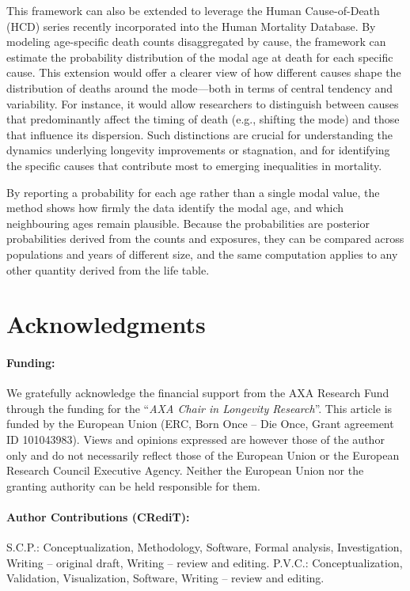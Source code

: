 \documentclass[12pt, letterpaper]{article}
\begin{document}
This framework can also be extended to leverage the Human Cause-of-Death (HCD) series recently incorporated into the Human Mortality Database. By modeling age-specific death counts disaggregated by cause, the framework can estimate the probability distribution of the modal age at death for each specific cause. This extension would offer a clearer view of how different causes shape the distribution of deaths around the mode—both in terms of central tendency and variability. For instance, it would allow researchers to distinguish between causes that predominantly affect the timing of death (e.g., shifting the mode) and those that influence its dispersion. Such distinctions are crucial for understanding the dynamics underlying longevity improvements or stagnation, and for identifying the specific causes that contribute most to emerging inequalities in mortality.

By reporting a probability for each age rather than a single modal value, the method shows how firmly the data identify the modal age, and which neighbouring ages remain plausible. Because the probabilities are posterior probabilities derived from the counts and exposures, they can be compared across populations and years of different size, and the same computation applies to any other quantity derived from the life table.

\section*{Acknowledgments}

\paragraph*{Funding:}
We gratefully acknowledge the financial support from the AXA Research Fund through the funding for the “\textit{AXA Chair in Longevity Research}”. This article is funded by the European Union (ERC, Born Once – Die Once, Grant agreement ID 101043983). Views and opinions expressed are however those of the author only and do not necessarily reflect those of the European Union or the European Research Council Executive Agency. Neither the European Union nor the granting authority can be held responsible for them.

\paragraph*{Author Contributions (CRediT):}
S.C.P.: Conceptualization, Methodology, Software, Formal analysis, Investigation, Writing -- original draft, Writing -- review and editing. P.V.C.: Conceptualization, Validation, Visualization, Software, Writing -- review and editing.
\end{document}
